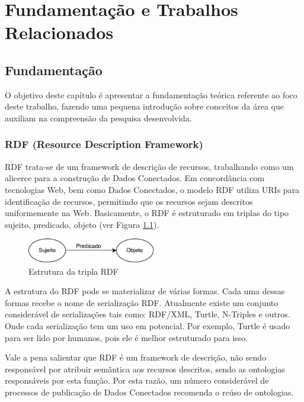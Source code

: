 \chapter{Fundamentação e Trabalhos Relacionados}
\label{cap:fundamentacao}

\section{Fundamentação}
O objetivo deste capítulo é apresentar a fundamentação teórica referente ao foco deste trabalho, fazendo uma pequena introdução  sobre conceitos da área que auxiliam na compreensão da pesquisa desenvolvida.

\subsection{RDF (Resource Description Framework)}

RDF trata-se de um framework de descrição de recursos, trabalhando como um alicerce para a construção de Dados Conectados. Em concordância com tecnologias Web, bem como Dados Conectados, o modelo RDF utiliza URIs para identificação de recursos, permitindo que os recursos sejam descritos uniformemente na Web. Basicamente, o RDF é estruturado em triplas do tipo sujeito, predicado, objeto (ver Figura \ref{fig:spo}). 

\begin{figure}[!ht]
	\centering
	\includegraphics[width=0.5\textwidth]{./imagens/Sujeito-predicado-objeto.pdf}
    \caption{Estrutura da tripla RDF}
	\label{fig:spo}
\end{figure}

A estrutura do RDF pode se materializar de várias formas. Cada uma dessas formas recebe o nome de serialização RDF. Atualmente existe um conjunto considerável de serializações tais como: RDF/XML, Turtle, N-Triples e outros. Onde cada serialização tem um uso em potencial. Por exemplo, Turtle é usado para ser lido por humanos, pois ele é melhor estruturado para isso. 

Vale a pena salientar que RDF é um framework de descrição, não sendo responsável por atribuir semântica aos recursos descritos, sendo as ontologias responsáveis por esta função. Por esta razão, um número considerável de processos de publicação de Dados Conectados \cite{bizer2007publish, hyland2011joy, villazon2011methodological, Avila2015} recomenda o reúso de ontologias. 


